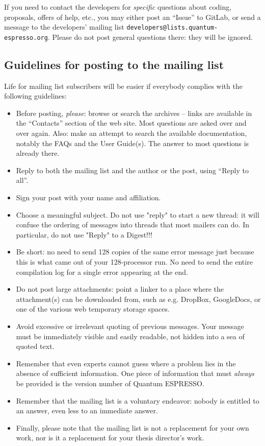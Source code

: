 \documentclass[12pt,a4paper]{article}
\def\qe{{\sc Quantum ESPRESSO}}
\begin{document}
If you need to contact the developers for {\em specific} questions
about coding, proposals, offers of help, etc., you may either post
an ``Issue'' to GitLab, or send a message
to the developers' mailing list \texttt{developers@lists.quantum-espresso.org}.
Please do not post general questions there: they will be ignored.

\subsection{Guidelines for posting to the mailing list}
\label{SubSec:Guidelines}
Life for mailing list subscribers will be easier if everybody
complies with the following guidelines:
\begin{itemize}
\item Before posting, {\em please}: browse or search the archives --
  links are available in the ``Contacts'' section  of the   web site.
  Most questions are asked over and over again. Also: make an attempt
  to search the
  available documentation, notably the FAQs and the User Guide(s).
  The answer to most questions is already there.
\item Reply to both the mailing list and the author or the post, using
  ``Reply to all''.
\item Sign your post with your name and affiliation.
\item Choose a meaningful subject. Do not use "reply" to start a new
  thread:
  it will confuse the ordering of messages into threads that most mailers
  can do. In particular, do not use "Reply" to a Digest!!!
\item Be short: no need to send 128 copies of the same error message just
  because this is what came out of your 128-processor run. No need to
  send the entire compilation log for a single error appearing at the end.
\item Do not post large attachments: point a linker to a place where the
  attachment(s) can be downloaded from, such as e.g. DropBox, GoogleDocs, 
  or one of the various web temporary storage spaces.
\item Avoid excessive or irrelevant quoting of previous messages. Your
  message must be immediately visible and easily readable, not hidden
  into a sea of quoted text.
\item Remember that even experts cannot guess where a problem lies in
  the absence of sufficient information. One piece of information that
  must {\em always} be provided is the version number of \qe.
\item Remember that the mailing list is a voluntary endeavor: nobody is
  entitled to an answer, even less to an immediate answer.
\item Finally, please note that the mailing list is not a replacement
  for your own work, nor is it a replacement for your thesis director's
  work.
\end{itemize}
\end{document}

